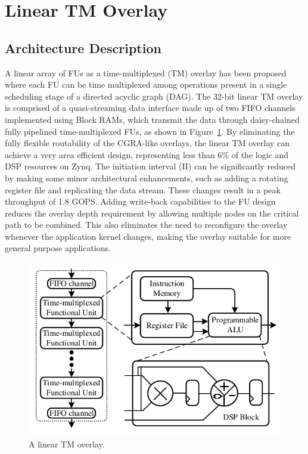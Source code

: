 \section{Linear TM Overlay}

\subsection{Architecture Description}
A linear array of FUs as a time-multiplexed (TM) overlay has been proposed~\cite{li2018time} where each FU can be time multiplexed among operations present in a single scheduling stage of a directed acyclic graph (DAG). 
The 32-bit linear TM overlay is comprised of a quasi-streaming data interface made up of two FIFO channels implemented using Block RAMs, which transmit the data through daisy-chained fully pipelined time-multiplexed FUs, as shown in Figure~\ref{overlay}. 
By eliminating the fully flexible routability of the CGRA-like overlays, the linear TM overlay can achieve a very area efficient design, representing less than 6\% of the logic and DSP resources on Zynq. 
The initiation interval (II) can be significantly reduced by making some minor architectural enhancements, such as adding a rotating register file and replicating the data stream. 
These changes result in a peak throughput of 1.8 GOPS. 
Adding write-back capabilities to the FU design reduces the overlay depth requirement by allowing multiple nodes on the critical path to be combined. 
This also eliminates the need to reconfigure the overlay whenever the application kernel changes, making the overlay suitable for more general purpose applications. 


\begin{figure}
    \centering
	\includegraphics[width=\columnwidth]{Figures/overlay.pdf}
	\caption{A linear TM overlay.}
	\label{overlay}
\end{figure}


